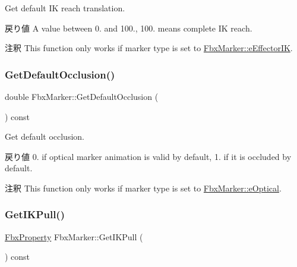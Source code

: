 Get default IK reach translation. \begin{DoxyReturn}{戻り値}
A value between 0. and 100., 100. means complete IK reach. 
\end{DoxyReturn}
\begin{DoxyRemark}{注釈}
This function only works if marker type is set to \hyperlink{class_fbx_marker_ad1e38753dce9a2212df0364466d9f617a6eb5815d51c3fd66217211a2a4e70538}{Fbx\+Marker\+::e\+Effector\+IK}. 
\end{DoxyRemark}
\mbox{\label{class_fbx_marker_a37de392731e4c44144fb72a7780a3c88}} 
\subsubsection{\texorpdfstring{Get\+Default\+Occlusion()}{GetDefaultOcclusion()}}
{\footnotesize\ttfamily double Fbx\+Marker\+::\+Get\+Default\+Occlusion (\begin{DoxyParamCaption}{ }\end{DoxyParamCaption}) const}

Get default occlusion. \begin{DoxyReturn}{戻り値}
0. if optical marker animation is valid by default, 1. if it is occluded by default. 
\end{DoxyReturn}
\begin{DoxyRemark}{注釈}
This function only works if marker type is set to \hyperlink{class_fbx_marker_ad1e38753dce9a2212df0364466d9f617abcf28e7d0ad09666bdf9d31f6aa05654}{Fbx\+Marker\+::e\+Optical}. 
\end{DoxyRemark}
\mbox{\label{class_fbx_marker_a7627d463d7ec1f933206d512998d2924}} 
\subsubsection{\texorpdfstring{Get\+I\+K\+Pull()}{GetIKPull()}}
{\footnotesize\ttfamily \hyperlink{class_fbx_property}{Fbx\+Property} Fbx\+Marker\+::\+Get\+I\+K\+Pull (\begin{DoxyParamCaption}{ }\end{DoxyParamCaption}) const}

